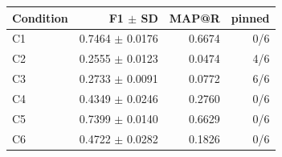 \begin{tabular}{lrrr}
\toprule
Condition & F1 $\pm$ SD & MAP@R & pinned \\
\midrule
C1 & 0.7464 $\pm$ 0.0176 & 0.6674 & 0/6 \\
C2 & 0.2555 $\pm$ 0.0123 & 0.0474 & 4/6 \\
C3 & 0.2733 $\pm$ 0.0091 & 0.0772 & 6/6 \\
C4 & 0.4349 $\pm$ 0.0246 & 0.2760 & 0/6 \\
C5 & 0.7399 $\pm$ 0.0140 & 0.6629 & 0/6 \\
C6 & 0.4722 $\pm$ 0.0282 & 0.1826 & 0/6 \\
\bottomrule
\end{tabular}
